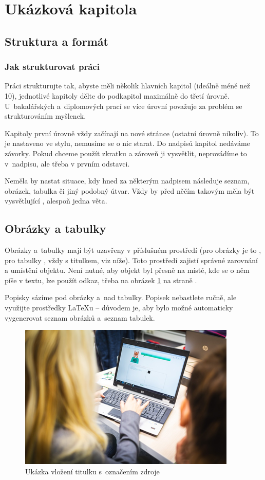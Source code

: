 \section{Ukázková kapitola}

\subsection{Struktura a formát}

\subsubsection{Jak strukturovat práci}



Práci strukturujte tak, abyste měli několik hlavních kapitol (ideálně méně než 10), jednotlivé kapitoly dělte do podkapitol maximálně do třetí úrovně. U~bakalářských a~diplomových prací se více úrovní považuje za problém se strukturováním myšlenek.

Kapitoly první úrovně vždy začínají na nové stránce (ostatní úrovně nikoliv). To je nastaveno ve stylu, nemusíme se o nic starat. Do nadpisů kapitol nedáváme závorky. Pokud chceme použít zkratku a zároveň ji vysvětlit, neprovádíme to v~nadpisu, ale třeba v prvním odstavci.

Neměla by nastat situace, kdy hned za některým nadpisem následuje seznam, obrázek, tabulka či jiný podobný útvar. Vždy by před něčím takovým měla být vysvětlující , alespoň jedna věta.



\subsection{Obrázky a tabulky}


Obrázky a~tabulky mají být uzavřeny v příslušném prostředí (pro obrázky je to , pro tabulky , vždy s titulkem, viz níže). Toto prostředí zajistí správné zarovnání a umístění objektu. Není nutné, aby objekt byl přesně na místě, kde se o něm píše v textu, lze použít odkaz, třeba na obrázek \ref{fig:slecnasnotebookem} na straně \pageref{fig:slecnasnotebookem}.

Popisky sázíme pod obrázky a~nad tabulky. Popisek nebastlete ručně, ale využijte prostředky \LaTeX u -- důvodem je, aby bylo možné automaticky vygenerovat seznam obrázků a~seznam tabulek.

\begin{figure}[htb]
	\centering
		\includegraphics[width=.5\textwidth]{slecna-s-notebookem.png}
	\caption[Ukázka vložení titulku s~označením zdroje]{Ukázka vložení titulku s~označením zdroje\cite{mytyprog}}
	\label{fig:slecnasnotebookem}
\end{figure}


